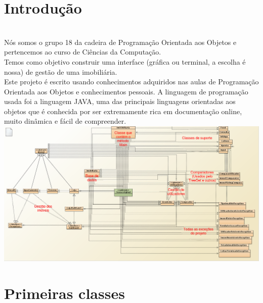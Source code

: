 \documentclass[12pt]{article}
\begin{document}

\maketitle                                            %
\pagebreak

\section{Introdução}
~\\

Nós somos o grupo 18 da cadeira de Programação Orientada aos Objetos e pertencemos ao curso de Ciências da Computação.
~\\ 

Temos como objetivo construir uma interface (gráfica ou terminal, a escolha é nossa) de gestão de uma imobiliária.
~\\

Este projeto é escrito usando conhecimentos adquiridos nas aulas de Programação Orientada aos Objetos e conhecimentos pessoais.
A linguagem de programação usada foi a linguagem JAVA, uma das principais linguagens orientadas aos objetos que é conhecida por ser extremamente rica em documentação online, muito dinâmica e fácil de compreender.
~\\


\includegraphics[scale=0.27]{004.png}	
\pagebreak

\section{Primeiras classes}
~\\
\end{document}

